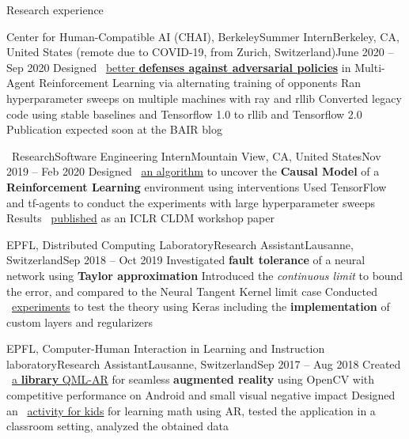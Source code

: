 \documentclass{resume} %
\newcommand*{\logo}[1]{%
	\raisebox{-.02\baselineskip}{%
		\texttt{[image: ./img/\#1]}%
	}%
}
\newcommand{\mylink}{{\color{gray}\faExternalLink}}
\begin{document}
\begin{rSection}{Research experience}
	\begin{rSubsection}{\logo{chai-logo.png} \logo{UCBerkeley.png} Center for Human-Compatible AI (CHAI), Berkeley}{Summer Intern}{Berkeley, CA, United States (remote due to COVID-19, from Zurich, Switzerland)}{June 2020 -- Sep 2020}
		\myitem Designed \mylink~\href{https://github.com/HumanCompatibleAI/better-adversarial-defenses/} {better {\bf defenses against {\bf adversarial policies}}} in Multi-Agent Reinforcement Learning via alternating training of opponents
		\myitem Ran hyperparameter sweeps on multiple machines with ray and rllib
		\myitem Converted legacy code using stable baselines and Tensorflow 1.0 to rllib and Tensorflow 2.0
		\myitem Publication expected soon at the BAIR blog
	\end{rSubsection}
	
	
	\begin{rSubsection}{{\large\vspace*{-0.7mm}\google}\ Research}{Software Engineering Intern}{Mountain View, CA, United States}{Nov 2019 -- Feb 2020}
		\myitem Designed \mylink~\href{https://causalrlworkshop.github.io/program/cldm_8.html}{an algorithm} to uncover the {\bf Causal Model} of a {\bf Reinforcement Learning} environment using interventions
		\myitem Used TensorFlow and tf-agents to conduct the experiments with large hyperparameter sweeps
		\myitem Results \mylink~\href{https://causalrlworkshop.github.io/pdf/CLDM_8.pdf}{published} as an ICLR CLDM workshop paper
	\end{rSubsection}


	\begin{rSubsection}{EPFL, Distributed Computing Laboratory}{Research Assistant}{Lausanne, Switzerland}{Sep 2018 -- Oct 2019}
		\myitem Investigated {\bf fault tolerance} of a neural network using {\bf Taylor approximation}
		\myitem Introduced the {\em continuous limit} to bound the error, and compared to the Neural Tangent Kernel limit case
		\myitem Conducted \mylink~\href{https://github.com/LPD-EPFL/ProbabilisticFaultToleranceNNs}{experiments} to test the theory using Keras including the {\bf implementation} of custom layers and regularizers
	\end{rSubsection}

	\begin{rSubsection}{EPFL, Computer-Human Interaction in Learning and Instruction laboratory}{Research Assistant}{Lausanne, Switzerland}{Sep 2017 -- Aug 2018}
		\myitem Created \mylink~\href{https://github.com/chili-epfl/qml-ar}{a {\color{black} \bf library} QML-AR} for seamless {\bf augmented reality} using OpenCV with competitive performance on Android and small visual negative impact
		\myitem Designed an \mylink~\href{https://youtu.be/B4-2qYsAKH4}{activity for kids} for learning math using AR, tested the application in a classroom setting, analyzed the obtained data
	\end{rSubsection}
	

\end{rSection}
\end{document}
